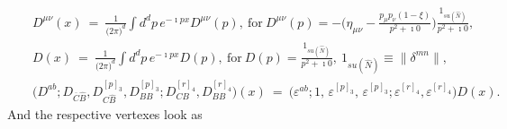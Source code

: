 \documentclass[10pt]{article}
\begin{document}
\begin{eqnarray}
  && D^{\mu\nu}(x)\  =\  \frac{1}{\big(2\pi\big)^d} \int d^dp \, e^{-\imath px}D^{\mu\nu}(p), \ \mathrm{for}  \ D^{\mu\nu}(p) =- \Big(\eta_{\mu\nu}-\frac{p_\mu p_\nu(1-\xi)}{p^2+\imath 0}\Big)\frac{1_{su(\hat{N})}}{p^2+\imath 0} , \label{FAprop} \\
  && D(x) \ = \  \frac{1}{\big(2\pi\big)^d} \int d^dp \, e^{-\imath px}D(p), \ \mathrm{for}  \ D(p) =\frac{1_{su(\hat{N})}}{p^2+\imath 0}, \ 1_{su(\hat{N})}\equiv \| \delta^{mn}\| , \label{Fghprop} \\
  && \Big(D^{ab}; D_{\overline{C}\widehat{B}},  D^{[p]_3}_{C\widehat{B}},  D^{[p]_3}_{BB}; D^{[r]_4}_{CB}, D^{[r]_4}_{BB}\Big)(x) \ = \  \Big(\varepsilon^{ab};  1,\, \varepsilon^{[p]_3},\, \varepsilon^{[p]_3};  \varepsilon^{[r]_4},\varepsilon^{[r]_4}\Big)D(x). \label{Fghpropg}
\end{eqnarray}
And  the respective vertexes look as
\end{document}
